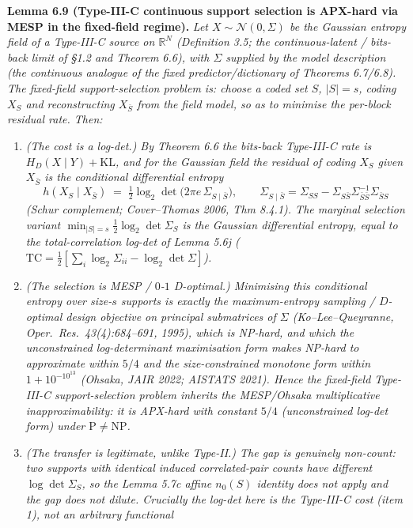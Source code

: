 \documentclass[
]{article}
\begin{document}
\textbf{Lemma 6.9 (Type-III-C continuous support selection is APX-hard via
MESP in the fixed-field regime).} \emph{Let $X\sim\mathcal N(0,\Sigma)$ be
the Gaussian entropy field of a Type-III-C source on $\mathbb R^N$
(Definition 3.5; the continuous-latent / bits-back limit of \S 1.2 and
Theorem 6.6), with $\Sigma$ supplied by the model description (the
continuous analogue of the fixed predictor/dictionary of Theorems
6.7/6.8). The \emph{fixed-field support-selection problem} is: choose a
coded set $S$, $|S|=s$, coding $X_S$ and reconstructing $X_{\bar S}$ from
the field model, so as to minimise the per-block residual rate. Then:}
\begin{enumerate}
\item \emph{(The cost is a log-det.) By Theorem 6.6 the bits-back
Type-III-C rate is $H_D(X\mid Y)+\mathrm{KL}$, and for the Gaussian field
the residual of coding $X_S$ given $X_{\bar S}$ is the conditional
differential entropy}
\[
h(X_S\mid X_{\bar S}) \;=\; \tfrac12\log_2\det\!\bigl(2\pi e\,
\Sigma_{S\mid\bar S}\bigr),\qquad
\Sigma_{S\mid\bar S}=\Sigma_{SS}-\Sigma_{S\bar S}\Sigma_{\bar S\bar
S}^{-1}\Sigma_{\bar S S}
\]
\emph{(Schur complement; Cover--Thomas 2006, Thm 8.4.1). The marginal
selection variant $\min_{|S|=s}\tfrac12\log_2\det\Sigma_S$ is the Gaussian
differential entropy, equal to the total-correlation log-det of Lemma 5.6j
($\mathrm{TC}=\tfrac12[\sum_i\log_2\Sigma_{ii}-\log_2\det\Sigma]$).}
\item \emph{(The selection is MESP / $0$-$1$ D-optimal.) Minimising this
conditional entropy over size-$s$ supports is exactly the maximum-entropy
sampling / $D$-optimal design objective on principal submatrices of
$\Sigma$ (Ko--Lee--Queyranne, \emph{Oper.\ Res.}\ 43(4):684--691, 1995),
which is NP-hard, and which the unconstrained log-determinant maximisation
form makes NP-hard to approximate within $5/4$ and the size-constrained
monotone form within $1+10^{-10^{13}}$ (Ohsaka, \emph{JAIR} 2022; AISTATS
2021). Hence the fixed-field Type-III-C support-selection problem inherits
the MESP/Ohsaka multiplicative inapproximability: it is APX-hard with
constant $5/4$ (unconstrained log-det form) under $\mathrm P\neq\mathrm{NP}$.}
\item \emph{(The transfer is legitimate, unlike Type-II.) The gap is
genuinely non-count: two supports with identical induced correlated-pair
counts have different $\log\det\Sigma_S$, so the Lemma 5.7c affine $n_0(S)$
identity does not apply and the gap does not dilute. Crucially the log-det
here \emph{is} the Type-III-C cost (item 1), not an arbitrary functional
}
\end{enumerate}
\end{document}
